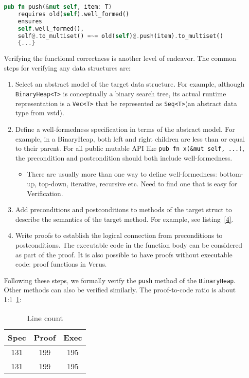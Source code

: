 \documentclass[conference]{IEEEtran}
\begin{document}
\begin{lstlisting}[language=Rust,style=colouredRust, caption={The specification of the \texttt{push} method of \texttt{BinaryHeap}.}, label = {4}]
    pub fn push(&mut self, item: T)
    requires old(self).well_formed()
    ensures 
    self.well_formed(),
    self@.to_multiset() =~= old(self)@.push(item).to_multiset()
    {...}
\end{lstlisting}
Verifying the functional correctness is another level of endeavor. The common steps for verifying any data structures are:
\begin{enumerate}
        \item Select an abstract model of the target data structure. For example, although \texttt{BinaryHeap<T>} is conceptually a binary search tree, its actual runtime representation is a \texttt{Vec<T>} that be represented as \texttt{Seq<T>}(an abstract data type from vstd).
   \item Define a well-formedness specification in terms of the abstract model. For example, in a BinaryHeap, both left and right children are less than or equal to their parent. For all public mutable API like \texttt{pub fn x(\&mut self, ...)}, the precondition and postcondition should both include well-formedness. 
   \begin{itemize}
        \item There are usually more than one way to define well-formedness: bottom-up, top-down, iterative, recursive etc. Need to find one that is easy for Verification.
   \end{itemize}
   \item Add preconditions and postconditions to methods of the target struct to describe the semantics of the target method. For example, see listing~\ref{4}.  
   \item Write proofs to establish the logical connection from preconditions to postconditions. The executable code in the function body can be considered as part of the proof. It is also possible to have proofs without executable code: proof functions in Verus. 
\end{enumerate}

Following these steps, we formally verify the \texttt{push} method of the \texttt{BinaryHeap}. Other methods can also be verified similarly. The proof-to-code ratio is about 1:1~\ref{Line count}:

\begin{table}[h]
\centering
\begin{tabular}{|c|c|c|}
\hline
\textbf{Spec} & \textbf{Proof} & \textbf{Exec} \\
\hline
131 & 199 & 195 \\
\hline
131 & 199 & 195 \\
\hline
\end{tabular}
\caption{Line count}
\label{Line count}
\end{table}
\end{document}
